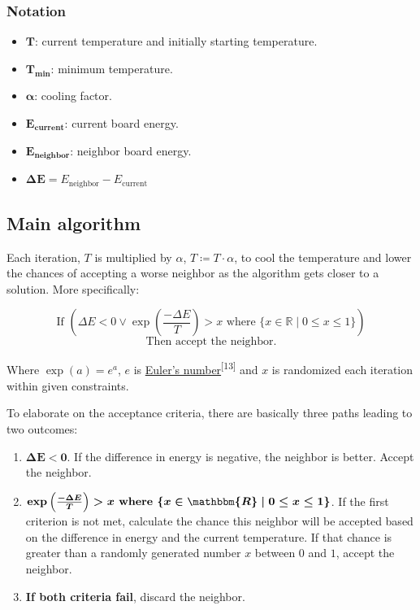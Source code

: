 \documentclass{article}
\begin{document}
\subsubsection{Notation}

\begin{itemize}
    \item \(\boldsymbol{T}\): current temperature and initially starting temperature.
    \item \(\boldsymbol{T_{\mathbf{min}}}\): minimum temperature.
    \item \(\boldsymbol{\alpha}\): cooling factor.
    \item \(\boldsymbol{E_{\mathbf{current}}}\): current board energy.
    \item \(\boldsymbol{E_{\mathbf{neighbor}}}\): neighbor board energy.
    \item \(\boldsymbol{\Delta E} = E_{\text{neighbor}} - E_{\text{current}}\)
\end{itemize}

\subsection{Main algorithm}

Each iteration, \(T\) is multiplied by \(\alpha\), \(T \coloneqq T \cdot \alpha\),
to cool the temperature and lower the chances of accepting a worse neighbor as the algorithm gets closer to a solution. More specifically:

\[
    \text{If } \left(\Delta E < 0 \lor \exp\left(\frac{-\Delta E}{T}\right) > x \text{ where } \{x \in \mathbb{R} \mid 0 \leq x \leq 1 \}\right)
\]
\[
    \text{Then accept the neighbor.}
\]

Where \( \exp(a) = e^a \), \( e \) is \href{https://en.wikipedia.org/wiki/E_(mathematical_constant)}{Euler's number}\textsuperscript{[13]}
and \( x \) is randomized each iteration within given constraints.

To elaborate on the acceptance criteria, there are basically three paths leading to two outcomes:

\begin{enumerate}
    \item \(\boldsymbol{\Delta E < 0}\). If the difference in energy is negative, the neighbor is better. Accept the neighbor.
    \item \(\boldsymbol{\exp\left(\frac{-\Delta E}{T}\right) > x \textbf{ where } \{x \in \mathbbm{R} \mid 0 \leq x \leq 1 \}}\).
          If the first criterion is not met, calculate the chance this neighbor will be accepted based on the difference in energy and
          the current temperature. If that chance is greater than a randomly generated number \(x\) between \(0\) and \(1\), accept the neighbor.
    \item \textbf{If both criteria fail}, discard the neighbor.
\end{enumerate}
\end{document}
